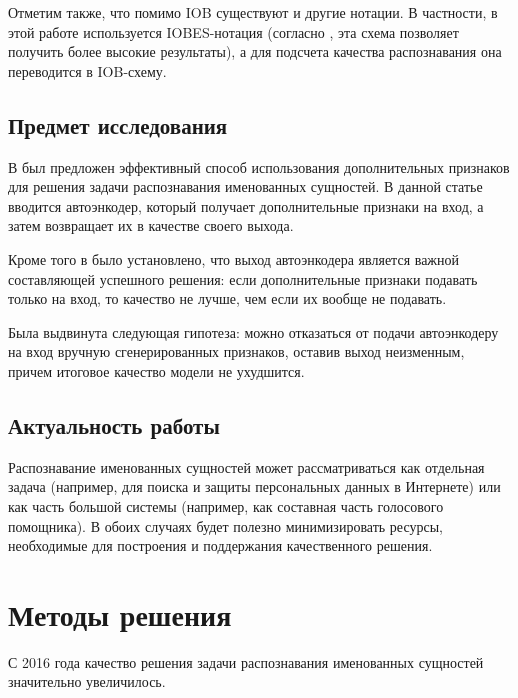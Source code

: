 \documentclass[a4paper,14pt]{extarticle}
\begin{document}
Отметим также, что помимо IOB существуют и другие нотации. В частности, в этой работе используется IOBES-нотация (согласно \cite{ratinov-roth-2009-design}, \cite{1511.08308} эта схема позволяет получить более высокие результаты), а для подсчета качества распознавания она переводится в IOB-схему.

\subsection{Предмет исследования}

В \cite{1808.09075} был предложен эффективный способ использования дополнительных признаков для решения задачи распознавания именованных сущностей. В данной статье вводится автоэнкодер, который получает дополнительные признаки на вход, а затем возвращает их в качестве своего выхода.

Кроме того в \cite{1808.09075} было установлено, что выход автоэнкодера является важной составляющей успешного решения: если дополнительные признаки подавать только на вход, то качество не лучше, чем если их вообще не подавать.

Была выдвинута следующая гипотеза: можно отказаться от подачи автоэнкодеру на вход вручную сгенерированных признаков, оставив выход неизменным, причем итоговое качество модели не ухудшится.

\subsection{Актуальность работы}

Распознавание именованных сущностей может рассматриваться как отдельная задача (например, для поиска и защиты персональных данных в Интернете) или как часть большой системы (например, как составная часть голосового помощника). В обоих случаях будет полезно минимизировать ресурсы, необходимые для построения и поддержания качественного решения.

\clearpage

\section{Методы решения}

С 2016 года качество решения задачи распознавания именованных сущностей значительно увеличилось.
\end{document}
